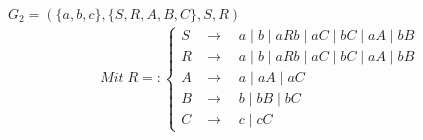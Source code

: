 $G_2=(\{a,b,c\},\{S,R,A,B,C\},S,R)$
\begin{align*}
	Mit\;R=:
	\begin{cases}
		S&\rightarrow\quad a\mid b\mid aRb\mid aC\mid bC\mid aA\mid bB\\
		R&\rightarrow\quad a\mid b\mid aRb\mid aC\mid bC\mid aA\mid bB\\
		A&\rightarrow\quad a\mid aA\mid aC\\
		B&\rightarrow\quad b\mid bB\mid bC\\
		C&\rightarrow\quad c\mid cC
	\end{cases}
\end{align*}
